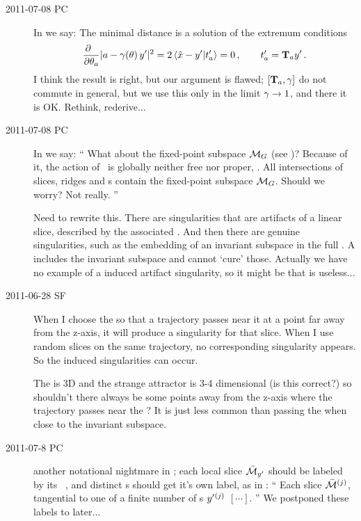\begin{description}
\item[2011-07-08 PC]
In  we say: The minimal distance is a solution of the
extremum conditions
\[ %
\frac{\partial ~~}{\partial \gSpace_a} |\ssp - \LieEl(\gSpace)\,\slicep|^2
   =
2\, \braket{\sspRed - \slicep}{\sliceTan{a}}
   = 0
    \,,\qquad
	  \sliceTan{a} = \Lg_a \slicep
\,.
\] %
I think the result is right, but our argument is flawed; $[\mathbf{T}_a,\gamma]$
do not commute in general, but we use this only in the limit $\gamma \to
1$, and there it is OK. Rethink, rederive...

\item[2011-07-08 PC]
In  we say:
``
What about the fixed-point subspace ${\cal M}_{G}$ (see )?
Because of it, the action of \Group\ is globally neither free nor proper,
\etc. All intersections of slices, ridges and {\sset s} contain the
fixed-point subspace ${\cal M}_{G}$. Should we worry? Not really.
''

Need to rewrite this. There are singularities that are artifacts of a
linear slice, described by the associated {\sset}. And then there are
genuine singularities, such as the embedding of an invariant subspace in
the full \statesp. A {\sset} includes the invariant subspace and cannot
`cure' those. Actually we have no example of a {\sset} induced artifact
singularity, so it might be that {\sset} is useless...

\item[2011-06-28 SF]
When I choose the {\sset} so that a trajectory passes near it at a point
far away from the z-axis, it will produce a singularity for that slice.
When I use random slices on the same trajectory, no corresponding
singularity appears. So the {\sset} induced singularities can occur.

The {\sset} is 3D and the strange attractor is 3-4 dimensional (is this
correct?) so shouldn't there always be some points away from the z-axis
where the trajectory passes near the {\sset}? It is just less common than
passing the {\sset} when close to the invariant subspace.

\item[2011-07-8 PC]
another notational nightmare in ; each local slice
$\bar{\cal M}_{{y'}} $ should be labeled by its \template\ \slicep, and
distinct \template s should get it's own label, as in
:
``
Each slice $\bar{\cal M}{}^{(j)}$, tangential to one of a finite number of
{\template s}  ${y'}{}^{(j)}$ $[\cdots]$.
''
We postponed these labels to later...


\end{description}
